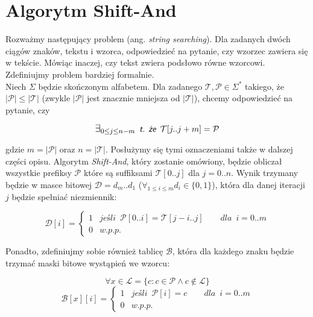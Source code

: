\section{Algorytm Shift-And}

\label{sec:shiftand}

Rozważmy następujący problem (ang. \textit{string searching}). Dla zadanych dwóch ciągów
znaków, tekstu i wzorca, odpowiedzieć na pytanie, czy wzorzec zawiera się w tekście.
Mówiąc inaczej, czy tekst zwiera podsłowo równe wzorcowi. Zdefiniujmy problem bardziej
formalnie. \\

Niech $\Sigma$ będzie skończonym alfabetem. Dla zadanego $\mathcal{T},\mathcal{P} \in \Sigma^*$
takiego, że $|\mathcal{P}| \le |\mathcal{T}|$ (zwykle $|\mathcal{P}|$ jest znacznie mniejsza od $|\mathcal{T}|$),
chcemy odpowiedzieć na pytanie, czy

\begin{equation}
    \label{eq:stringSearchingDefinition}
    \mathlarger{\exists_{0 \leq j \leq n - m}} \enspace
    \textit{\textsf{t. że}} \enspace \mathcal{T}[j..j+m] = \mathcal{P}
\end{equation}

gdzie $m = |\mathcal{P}|$ oraz $n = |\mathcal{T}|$. Posłużymy się tymi oznaczeniami także w dalszej
części opisu. Algorytm \textit{Shift-And}, który zostanie omówiony, będzie obliczał wszystkie
prefiksy $\mathcal{P}$ które są suffiksami $\mathcal{T}[0..j]$ dla $j=0..n$. Wynik trzymany będzie
w masce bitowej $\mathcal{D} = d_m..d_1$ ($\forall_{1 \leq i \leq m} d_{i} \in \{0, 1\} $), która dla danej iteracji $j$ będzie spełniać niezmiennik:

\begin{equation}
 \label{eq:invariant}
 \mathcal{D}[i] =
  \begin{cases}
      1 & \textit{jeśli} \enspace \mathcal{P}[0..i] = \mathcal{T}[j-i..j]
            \quad\quad dla \enspace i=0..m \\
      0 & w.p.p.
  \end{cases}
\end{equation}

Ponadto, zdefiniujmy sobie również tablicę $\mathcal{B}$, która dla każdego znaku będzie
trzymać maski bitowe wystąpień we wzorcu:

$$
    \forall x \in \mathcal{L} = \{c: c \in \mathcal{P} \wedge c \notin \mathcal{L}\}
$$
$$
    \mathcal{B}[x][i] =
     \begin{cases}
         1 & \textit{jeśli} \enspace \mathcal{P}[i] = c \quad\quad dla \enspace i=0..m \\
         0 & w.p.p.
     \end{cases}
$$

